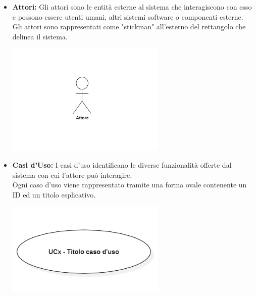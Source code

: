\documentclass{article}
\begin{document}
\begin{itemize}
    \item \textbf{Attori:}
    Gli attori sono le entità esterne al sistema che interagiscono con esso e possono essere utenti umani, altri sistemi software o componenti esterne. \\
    Gli attori sono rappresentati come "stickman" all'esterno del rettangolo che delinea il sistema.
    \begin{minipage}[t]{\linewidth}
        \centering
        \includegraphics[width=0.6\textwidth]{../Images/NormeDiProgetto/Attore.PNG}
    \end{minipage}

    \item \textbf{Casi d'Uso:}
    I casi d'uso identificano le diverse funzionalità offerte dal sistema con cui l'attore può interagire. \\
    Ogni caso d'uso viene rappresentato tramite una forma ovale contenente un ID ed un titolo esplicativo.
    \begin{minipage}[t]{\linewidth}
        \centering
        \includegraphics[width=0.6\textwidth]{../Images/NormeDiProgetto/UC.PNG}
    \end{minipage}


\end{itemize}
\end{document}
